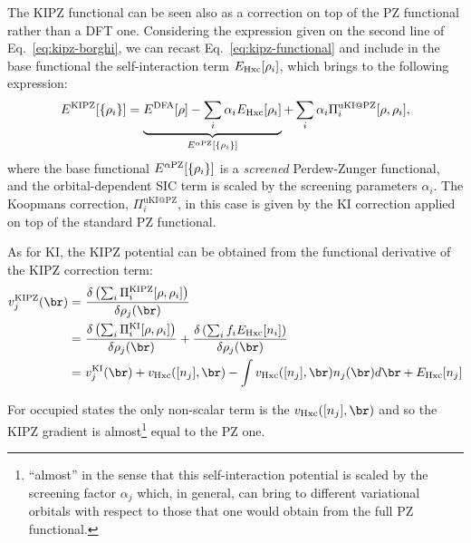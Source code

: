 The KIPZ functional can be seen also as a correction on top of the PZ functional rather than a DFT one. Considering the expression given on the second line of Eq.~\eqref{eq:kipz-borghi}, we can recast Eq.~\eqref{eq:kipz-functional} and include in the base functional the self-interaction term $E_{\rm Hxc}[\rho_i]$, which brings to the following expression:
%
\begin{equation}
    E^{\rm KIPZ}[\{\rho_i\}] = \underbrace{E^{\rm DFA}[\rho] - \sum_i \alpha_i E_{\rm Hxc}[\rho_i]}_{E^{\alpha\rm PZ}[\{\rho_i\}]} + \sum_i {\alpha_i} \Pi^{\text{uKI@PZ}}_i[\rho,\rho_i] ,
    \label{eq:kipz-as-ki-on-pz}
\end{equation}
%
where the base functional $E^{\alpha\rm PZ}[\{\rho_i\}]$ is a \emph{screened} Perdew-Zunger functional, and the orbital-dependent SIC term is scaled by the screening parameters $\alpha_i$. The Koopmans correction, $\Pi^{\text{uKI@PZ}}_i$, in this case is given by the KI correction applied on top of the standard PZ functional.

As for KI, the KIPZ potential can be obtained from the functional derivative of the KIPZ correction term:
%
\begin{equation}
    \begin{split}
        v^{\rm KIPZ}_j(\br) =\ &\frac{\delta \left( \sum_i \Pi^{\rm KIPZ}_i[\rho,\rho_i] \right)}{\delta \rho_j(\br)} \\
        =\ &\frac{\delta \left( \sum_i \Pi^{\text{KI}}_i[\rho,\rho_i] \right)}{\delta \rho_j(\br)} + 
        \frac{\delta \left( \sum_i f_i E_{\rm Hxc}[n_i] \right)}{\delta \rho_j(\br)} \\
        =\ &v^{\text{KI}}_j(\br) + v_{\rm Hxc}([n_j],\br) - \int v_{\rm Hxc}([n_j],\br) n_j(\br) d\br + E_{\rm Hxc}[n_j]
    \end{split}
\end{equation}

For occupied states the only non-scalar term is the $v_{\rm Hxc}([n_j],\br)$ and so the KIPZ gradient is almost\footnote{``almost'' in the sense that this self-interaction potential is scaled by the screening factor $\alpha_j$ which, in general, can bring to different variational orbitals with respect to those that one would obtain from the full PZ functional.} equal to the PZ one.